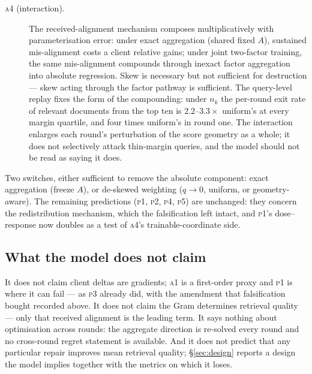\begin{description}
\item[\textsc{a4} (interaction).] The received-alignment mechanism composes
multiplicatively with parameterisation error: under exact aggregation
(shared fixed $A$), sustained mis-alignment costs a client relative gains;
under joint two-factor training, the same mis-alignment compounds through
inexact factor aggregation into absolute regression. Skew is necessary but
not sufficient for destruction --- skew acting through the factor pathway is
sufficient. The query-level replay fixes the form of the compounding: under
$n_k$ the per-round exit rate of relevant documents from the top ten is
$2.2$--$3.3\times$ uniform's at every margin quartile, and four times uniform's
in round one. The interaction enlarges each round's perturbation of the score
geometry as a whole; it does not selectively attack thin-margin queries, and
the model should not be read as saying it does.
\end{description}

Two switches, either sufficient to remove the absolute component: exact
aggregation (freeze $A$), or de-skewed weighting ($q\to0$, uniform, or
geometry-aware). The remaining predictions (\textsc{p1}, \textsc{p2},
\textsc{p4}, \textsc{p5}) are unchanged: they concern the redistribution
mechanism, which the falsification left intact, and \textsc{p1}'s
dose--response now doubles as a test of \textsc{a4}'s trainable-coordinate
side.

\subsection{What the model does not claim}

It does not claim client deltas are gradients; \textsc{a1} is a first-order
proxy and \textsc{p1} is where it can fail --- as \textsc{p3} already did,
with the amendment that falsification bought recorded above. It does not claim the Gram
determines retrieval quality --- only that received alignment is the leading
term. It says nothing about optimisation across rounds: the aggregate direction
is re-solved every round and no cross-round regret statement is available. And
it does not predict that any particular repair improves mean retrieval quality;
\S\ref{sec:design} reports a design the model implies together with the metrics
on which it loses.
